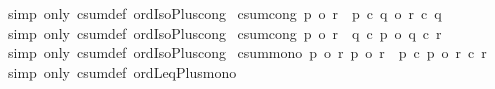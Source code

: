 \begin{isabellebody}
%
\isadelimproof
%
\endisadelimproof
%
\isatagproof
{}\isamarkupfalse%
\ {\isacharparenleft}{\kern0pt}simp\ only{\isacharcolon}{\kern0pt}\ csum{\isacharunderscore}{\kern0pt}def\ ordIso{\isacharunderscore}{\kern0pt}Plus{\isacharunderscore}{\kern0pt}cong{\isacharparenright}{\kern0pt}%
\endisatagproof
{\isafoldproof}%
%
\isadelimproof
\isanewline
%
\endisadelimproof
\isanewline
{}\isamarkupfalse%
\ csum{\isacharunderscore}{\kern0pt}cong{}{\isacharcolon}{\kern0pt}\ {\isachardoublequoteopen}p{}\ {\isacharequal}{\kern0pt}o\ r{}\ {\isasymLongrightarrow}\ p{}\ {\isacharplus}{\kern0pt}c\ q\ {\isacharequal}{\kern0pt}o\ r{}\ {\isacharplus}{\kern0pt}c\ q{\isachardoublequoteclose}\isanewline
%
\isadelimproof
%
\endisadelimproof
%
\isatagproof
{}\isamarkupfalse%
\ {\isacharparenleft}{\kern0pt}simp\ only{\isacharcolon}{\kern0pt}\ csum{\isacharunderscore}{\kern0pt}def\ ordIso{\isacharunderscore}{\kern0pt}Plus{\isacharunderscore}{\kern0pt}cong{}{\isacharparenright}{\kern0pt}%
\endisatagproof
{\isafoldproof}%
%
\isadelimproof
\isanewline
%
\endisadelimproof
\isanewline
{}\isamarkupfalse%
\ csum{\isacharunderscore}{\kern0pt}cong{}{\isacharcolon}{\kern0pt}\ {\isachardoublequoteopen}p{}\ {\isacharequal}{\kern0pt}o\ r{}\ {\isasymLongrightarrow}\ q\ {\isacharplus}{\kern0pt}c\ p{}\ {\isacharequal}{\kern0pt}o\ q\ {\isacharplus}{\kern0pt}c\ r{}{\isachardoublequoteclose}\isanewline
%
\isadelimproof
%
\endisadelimproof
%
\isatagproof
{}\isamarkupfalse%
\ {\isacharparenleft}{\kern0pt}simp\ only{\isacharcolon}{\kern0pt}\ csum{\isacharunderscore}{\kern0pt}def\ ordIso{\isacharunderscore}{\kern0pt}Plus{\isacharunderscore}{\kern0pt}cong{}{\isacharparenright}{\kern0pt}%
\endisatagproof
{\isafoldproof}%
%
\isadelimproof
\isanewline
%
\endisadelimproof
\isanewline
{}\isamarkupfalse%
\ csum{\isacharunderscore}{\kern0pt}mono{\isacharcolon}{\kern0pt}\ {\isachardoublequoteopen}{\isasymlbrakk}p{}\ {\isasymle}o\ r{}{\isacharsemicolon}{\kern0pt}\ p{}\ {\isasymle}o\ r{}{\isasymrbrakk}\ {\isasymLongrightarrow}\ p{}\ {\isacharplus}{\kern0pt}c\ p{}\ {\isasymle}o\ r{}\ {\isacharplus}{\kern0pt}c\ r{}{\isachardoublequoteclose}\isanewline
%
\isadelimproof
%
\endisadelimproof
%
\isatagproof
{}\isamarkupfalse%
\ {\isacharparenleft}{\kern0pt}simp\ only{\isacharcolon}{\kern0pt}\ csum{\isacharunderscore}{\kern0pt}def\ ordLeq{\isacharunderscore}{\kern0pt}Plus{\isacharunderscore}{\kern0pt}mono{\isacharparenright}{\kern0pt}%

\end{isabellebody}
